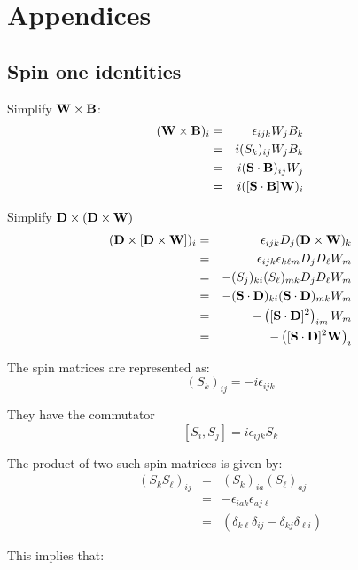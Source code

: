 \appendix

\chapter{Appendices}




\section{Spin one identities}

Simplify $ \mathbf{W} \times \mathbf{B}$:
\begin{eqnarray*}
(\mathbf{W} \times \mathbf{B})_i
	&=&	\epsilon_{ijk} W_j B_k	\\
	&=&	i(S_k)_{ij} W_j B_k\\
	&=&	i(\mathbf{S} \cdot \mathbf{B})_{ij} W_j	\\
	&=&	i([\mathbf{S} \cdot \mathbf{B}] \mathbf{W})_i
\end{eqnarray*}

Simplify $\mathbf{D} \times ( \mathbf{D} \times \mathbf{W} ) $
\begin{eqnarray*}
(\mathbf{D} \times [ \mathbf{D} \times \mathbf{W} ] )_i
	&=&	\epsilon_{ijk} D_j (\mathbf{D} \times \mathbf{W})_k	\\
	&=&	\epsilon_{ijk} \epsilon_{k\ell m} D_j D_\ell W_m	\\
	&=&	-(S_j)_{ki} (S_\ell)_{mk} D_j D_\ell W_m	\\
	&=&	-(\mathbf{S} \cdot \mathbf{D})_{ki} (\mathbf{S} \cdot \mathbf{D})_{mk} W_m	\\
	&=&	-\left( [\mathbf{S} \cdot \mathbf{D}]^2 \right)_{im} W_m	\\
	&=&	-\left( [\mathbf{S} \cdot \mathbf{D}]^2 \mathbf{W} \right)_i	\\
\end{eqnarray*}

The spin matrices are represented as:
$${(S_k)}_{ij}=-i \epsilon_{ijk}$$

They have the commutator
$$	[S_i, S_j] = i \epsilon_{ijk} S_k $$

The product of two such spin matrices is given by:
\begin{eqnarray*}
{(S_k S_\ell)}_{ij} 
	& = & {(S_k)}_{ia} {(S_\ell)}_{aj} \\
	& = & -\epsilon_{iak} \epsilon_{aj\ell} \\
	& = & (\delta_{k\ell} \delta_{ij} - \delta_{kj} \delta_{\ell i} )
\end{eqnarray*}

This implies that:

